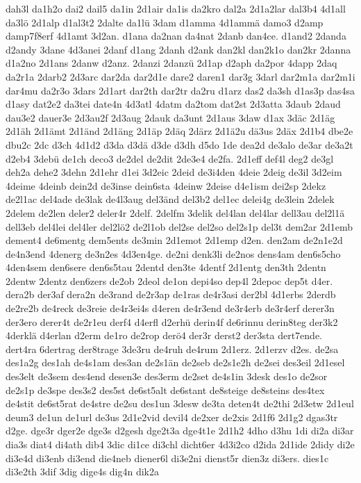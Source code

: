 {dah3l
da1h2o
dai2
dail5
da1in
2d1air
da1is
da2kro
dal2a
2d1a2lar
dal3b4
4d1all
da3lö
2d1alp
d1al3t2
2dalte
da1lü
3dam
d1amma
4d1ammä
damo3
d2amp
damp7f8erf
4d1amt
3d2an.
d1ana
da2nan
da4nat
2danb
dan4ce.
d1and2
2danda
d2andy
3dane
4d3anei
2danf
d1ang
2danh
d2ank
dan2kl
dan2k1o
dan2kr
2danna
d1a2no
2d1ans
2danw
d2anz.
2danzi
2danzü
2d1ap
d2aph
da2por
4dapp
2daq
da2r1a
2darb2
2d3arc
dar2da
dar2d1e
dare2
daren1
dar3g
3darl
dar2m1a
dar2m1i
dar4mu
da2r3o
3dars
2d1art
dar2th
dar2tr
da2ru
d1arz
das2
da3sh
d1as3p
das4sa
d1asy
dat2e2
da3tei
date4n
4d3atl
4datm
da2tom
dat2st
2d3atta
3daub
2daud
dau3e2
dauer3e
2d3au2f
2d3aug
2dauk
da3unt
2d1aus
3daw
d1ax
3däc
2d1äg
2d1äh
2d1ämt
2d1änd
2d1äng
2d1äp
2däq
2därz
2d1ä2u
dä3us
2däx
2d1b4
dbe2e
dbu2c
2dc
d3ch
4d1d2
d3da
d3dä
d3de
d3dh
d5do
1de
dea2d
de3alo
de3ar
de3a2t
d2eb4
3debü
de1ch
deco3
de2del
de2dit
2de3e4
de2fa.
2d1eff
def4l
deg2
de3gl
deh2a
dehe2
3dehn
2d1ehr
d1ei
3d2eic
2deid
de3i4den
4deie
2deig
de3il
3d2eim
4deime
4deinb
dein2d
de3inse
dein6sta
4deinw
2deise
d4e1ism
dei2sp
2dekz
de2l1ac
del4ade
de3lak
de4l3aug
del3änd
del3b2
del1ec
delei4g
de3lein
2delek
2delem
de2len
deler2
deler4r
2delf.
2delfm
3delik
del4lan
del4lar
dell3au
del2l1ä
dell3eb
del4lei
del4ler
del2lö2
de2l1ob
del2se
del2so
del2s1p
del3t
dem2ar
2d1emb
dement4
de6mentg
dem5ents
de3min
2d1emot
2d1emp
d2en.
den2am
de2n1e2d
de4n3end
4denerg
de3n2es
4d3en4ge.
de2ni
denk3li
de2nos
dens4am
den6s5cho
4den4sem
den6sere
den6s5tau
2dentd
den3te
4dentf
2d1entg
den3th
2dentn
2dentw
2dentz
den6zers
de2ob
2deol
de1on
depi4so
dep4l
2depoc
dep5t
d4er.
dera2b
der3af
dera2n
de3rand
de2r3ap
de1ras
de4r3asi
der2bl
4d1erbs
2derdb
de2re2b
de4reck
de3reie
de4r3ei4s
d4eren
de4r3end
de3r4erb
de3r4erf
derer3n
der3ero
derer4t
de2r1eu
derf4
d4erfl
d2erhü
derin4f
de6rinnu
derin8teg
der3k2
4derklä
d4erlan
d2erm
de1ro
de2rop
derö4
der3r
derst2
der3sta
dert7ende.
dert4ra
6dertrag
der8trage
3de3ru
de4ruh
de4rum
2d1erz.
2d1erzv
d2es.
de2sa
des1a2g
des1ah
de4s1am
des3an
de2s1än
de2seb
de2s1e2h
de2sei
des3eil
2d1esel
des3elt
de3sem
des4end
desen3e
des3erm
de2set
de4s1in
3desk
des1o
de2sor
de2s1p
de3spe
des3s2
des5st
de6st5alt
de6stant
de8steige
de8steins
des4tex
de4stit
de6st5rat
de4stre
de2su
des1un
3desw
de3ta
deten4t
de2thi
2d3etw
2d1eul
deum3
de1un
de1url
de3us
2d1e2vid
devil4
de2xer
de2xis
2d1f6
2d1g2
dgas3tr
d2ge.
dge3r
dger2e
dge3s
d2gesh
dge2t3a
dge4t1e
2d1h2
4dho
d3hu
1di
di2a
di3ar
dia3s
diat4
di4ath
dib4
3dic
di1ce
di3chl
dicht6er
4d3i2co
d2ida
2d1ide
2didy
di2e
di3e4d
di3enb
di3end
die4neb
diener6l
di3e2ni
dienst5r
dien3z
di3ers.
dies1c
di3e2th
3dif
3dig
dige4s
dig4n
dik2a
}
